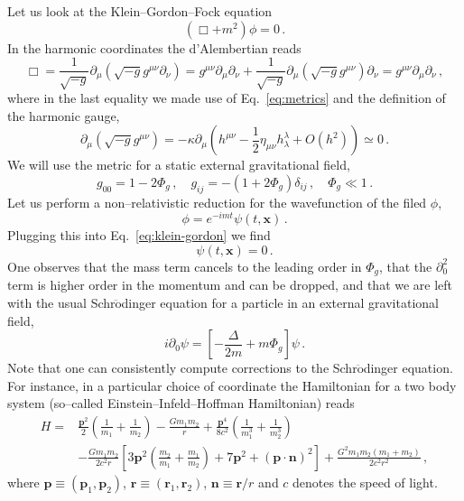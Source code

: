 \documentclass[11pt,a4paper]{article}
\newcommand{\be}{\begin{equation}}
\newcommand{\ee}{\end{equation}}
\newcommand\m{\mu}
\newcommand\n{\nu}
\renewcommand\l{\lambda}
\def\d{\partial}
\begin{document}
Let us look at the Klein--Gordon--Fock equation
\be
\label{eq:klein-gordon}
(\Box+m^2) \phi=0\,.
\ee
In the harmonic coordinates the d'Alembertian reads
\be
\Box=\frac{1}{\sqrt{-g}} \d_\m (\sqrt{-g}g^{\m\n}\d_\n)=g^{\m\n}\d_\m\d_\n+
\frac{1}{\sqrt{-g}} \d_\m(\sqrt{-g}g^{\m\n})\d_\n=g^{\m\n}\d_\m\d_\n\,,
\ee
where in the last equality we made use of Eq.~\eqref{eq:metrics} and the definition of the harmonic gauge,
\be
\d_\m(\sqrt{-g}g^{\m\n})=-\kappa \d_\m\left(h^{\m\n}-\frac{1}{2}\eta_{\m\n}h^\l_\l+O(h^2)\right)\simeq 0\,.
\ee
We will use the metric for a static external gravitational field,
\be
g_{00}=1-2\Phi_g\,,\quad  g_{ij}=-(1+2\Phi_g)\delta_{ij}\,,\quad \Phi_g \ll 1\,.
\ee
Let us perform a non--relativistic reduction for the wavefunction of the filed $\phi$,
\be
\phi=e^{-imt}\psi(t,\textbf{x})\,.
\ee
Plugging this into Eq.~\eqref{eq:klein-gordon} we find
\be
[(1+2\Phi_g)(-m^2-2im\d_0+\d_0^2)-\delta^{ij}\d_i\d_j+m^2] \psi(t,\textbf{x})=0\,.
\ee
One observes that the mass term cancels to the leading order in $\Phi_g$, that the $\partial_0^2$ term is higher order
in the momentum and can be dropped,
and that we are left with the usual Schr$\ddot{\text{o}}$dinger equation for
a particle in an external gravitational field,
\be
i\d_0\psi=\left[-\frac{\Delta}{2m}+m \Phi_g \right]\psi\,.
\ee
Note that one can consistently compute corrections
to the Schr$\ddot{\text{o}}$dinger equation.
For instance, in a particular choice of coordinate the Hamiltonian for a two body system (so--called Einstein--Infeld--Hoffman Hamiltonian)
reads \cite{Einstein:1938yz}
\be
\begin{split}
H=&\frac{\textbf{p}^2}{2}\left(\frac{1}{m_1}+\frac{1}{m_2}\right)-\frac{Gm_1m_2}{r}
+\frac{\textbf{p}^4}{8c^2}\left(\frac{1}{m_1^3}+\frac{1}{m_2^3}\right)\\
&-\frac{Gm_1m_2}{2c^2 r}\left[3\textbf{p}^2\left(\frac{m_2}{m_1}+\frac{m_1}{m_2}\right)+7\textbf{p}^2
+(\textbf{p}\cdot \textbf{n})^2
\right]+\frac{G^2m_1m_2(m_1+m_2)}{2c^2r^2}\,,
\end{split}
\ee
where $\textbf{p}\equiv (\textbf{p}_1,\textbf{p}_2)$,
$\textbf{r}\equiv (\textbf{r}_1,\textbf{r}_2)$,
$\textbf{n}\equiv \textbf{r}/r$ and $c$ denotes the speed of light.
\end{document}
